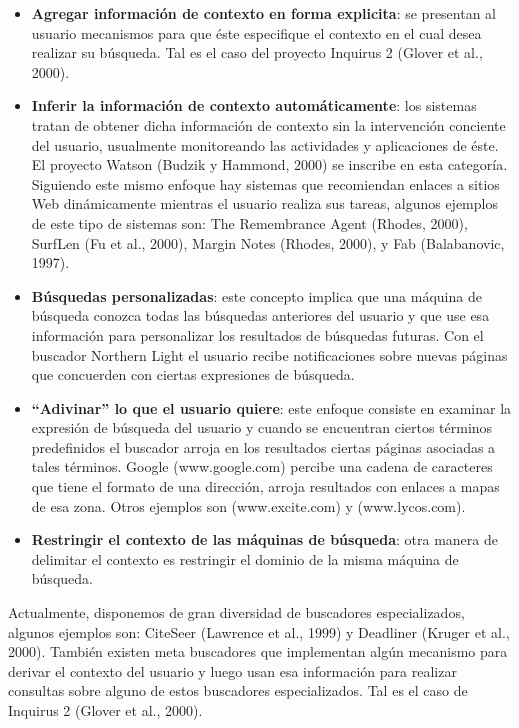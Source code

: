 \begin{itemize}

\item \textbf{Agregar información de contexto en forma explicita}: se presentan
al usuario
mecanismos para que éste especifique el contexto en el cual desea realizar su
búsqueda. Tal es el caso del proyecto Inquirus 2 (Glover et al., 2000).

\item \textbf{Inferir la información de contexto automáticamente}: los sistemas
tratan de obtener
dicha información de contexto sin la intervención conciente del usuario,
usualmente
monitoreando las actividades y aplicaciones de éste. El proyecto Watson (Budzik
y
Hammond, 2000) se inscribe en esta categoría. Siguiendo este mismo enfoque hay
sistemas que recomiendan enlaces a sitios Web dinámicamente mientras el usuario
realiza sus tareas, algunos ejemplos de este tipo de sistemas son: The
Remembrance
Agent (Rhodes, 2000), SurfLen (Fu et al., 2000), Margin Notes (Rhodes, 2000), y
Fab (Balabanovic, 1997).

\item \textbf{Búsquedas personalizadas}: este concepto implica que una máquina
de búsqueda
conozca todas las búsquedas anteriores del usuario y que use esa información
para
personalizar los resultados de búsquedas futuras. Con el buscador Northern Light
el
usuario recibe notificaciones sobre nuevas páginas que concuerden con ciertas
expresiones de búsqueda.

\item \textbf{“Adivinar” lo que el usuario quiere}: este enfoque consiste en
examinar la expresión
de búsqueda del usuario y cuando se encuentran ciertos términos predefinidos el
buscador arroja en los resultados ciertas páginas asociadas a tales términos.
Google
(www.google.com) percibe una cadena de caracteres que tiene el formato de una
dirección, arroja resultados con enlaces a mapas de esa zona. Otros ejemplos son
(www.excite.com) y (www.lycos.com).

\item \textbf{Restringir el contexto de las máquinas de búsqueda}: otra manera
de delimitar el
contexto es restringir el dominio de la misma máquina de búsqueda. 

\end{itemize}


Actualmente, disponemos de gran diversidad de buscadores especializados, algunos
ejemplos son:
CiteSeer (Lawrence et al., 1999) y Deadliner (Kruger et al., 2000). También
existen meta buscadores que implementan algún mecanismo para derivar el contexto del
usuario y luego usan esa información para realizar consultas sobre alguno de estos
buscadores especializados. Tal es el caso de Inquirus 2 (Glover et al., 2000).

